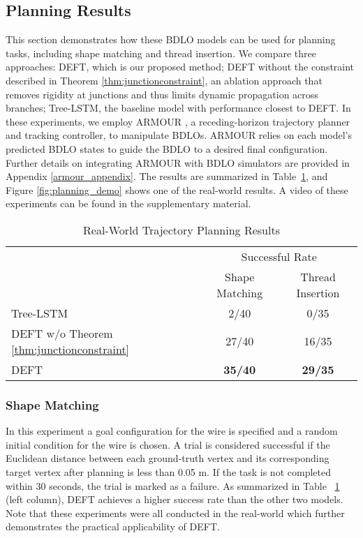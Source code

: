 \subsection{Planning Results}


This section demonstrates how these BDLO models can be used for planning tasks, including shape matching and thread insertion. 
We compare three approaches: 
DEFT, which is our proposed method; 
DEFT without the constraint described in Theorem \ref{thm:junctionconstraint}, an ablation approach that removes rigidity at junctions and thus limits dynamic propagation across branches;
Tree-LSTM, the baseline model with performance closest to DEFT. 
In these experiments, we employ ARMOUR \cite{ARMOUR}, a receding-horizon trajectory planner and tracking controller, to manipulate BDLOs. 
ARMOUR relies on each model’s predicted BDLO states to guide the BDLO to a desired final configuration. 
Further details on integrating ARMOUR with BDLO simulators are provided in Appendix \ref{armour_appendix}.
The results are summarized in Table~\ref{tab:planning}, and Figure \ref{fig:planning_demo} shows one of the real-world results.
A video of these experiments can be found in the supplementary material.

\begin{table}[t]
    \caption{Real-World Trajectory Planning Results}
            \centering
    \begin{tabular}{l||c|c}
        \toprule
        & \multicolumn{2}{c}{Successful Rate}  \\     
        & \multicolumn{1}{c}{Shape Matching} & \multicolumn{1}{c}{Thread Insertion} \\         
        \hline
        Tree-LSTM \cite{treeLSTM} & 2/40 & 0/35\\
        DEFT w/o Theorem \ref{thm:junctionconstraint} & 27/40 & 16/35 \\
        DEFT & \textbf{35/40} & \textbf{29/35} \\
        \bottomrule
    \end{tabular}
    \label{tab:planning}
            \centering
\end{table}
\subsubsection{Shape Matching}
In this experiment a goal configuration for the wire is specified and a random initial condition for the wire is chosen. 
 A trial is considered successful if the Euclidean distance between each ground-truth vertex and its corresponding target vertex after planning is less than 0.05 m.
If the task is not completed within 30 seconds, the trial is marked as a failure. 
As summarized in Table ~\ref{tab:planning} (left column), DEFT achieves a higher success rate than the other two models.
Note that these experiments were all conducted in the real-world which further demonstrates the practical applicability of DEFT.

